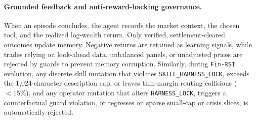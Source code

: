 \paragraph{Grounded feedback and anti-reward-hacking governance.}
When an episode concludes, the agent records the market context, the chosen tool, and the
realized log-wealth return. Only verified, settlement-cleared outcomes update memory. Negative returns
are retained as learning signals, while trades relying on look-ahead data, unbalanced panels, or
unadjusted prices are rejected by guards to prevent memory corruption. Similarly, during
\texttt{Fin-RSI} evolution, any discrete skill mutation that violates \texttt{SKILL\_HARNESS\_LOCK},
exceeds the 1{,}024-character description cap, or leaves thin-margin routing collisions ($<15\%$),
and any operator mutation that alters \texttt{HARNESS\_LOCK}, triggers a counterfactual guard
violation, or regresses on sparse small-cap or crisis slices, is automatically rejected.

